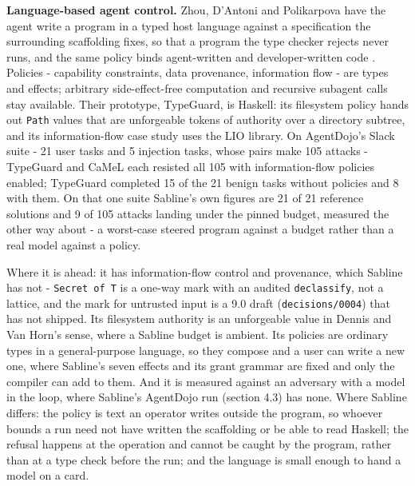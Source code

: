 \documentclass[
]{article}
\newcounter{none} %
\begin{document}
\textbf{Language-based agent control.} Zhou, D'Antoni and Polikarpova
have the agent write a program in a typed host language against a
specification the surrounding scaffolding fixes, so that a program the
type checker rejects never runs, and the same policy binds agent-written
and developer-written code \citep{zhou2026lbac}. Policies - capability
constraints, data provenance, information flow - are types and effects;
arbitrary side-effect-free computation and recursive subagent calls stay
available. Their prototype, TypeGuard, is Haskell: its filesystem policy
hands out \texttt{Path} values that are unforgeable tokens of authority
over a directory subtree, and its information-flow case study uses the
LIO library. On AgentDojo's Slack suite - 21 user tasks and 5 injection
tasks, whose pairs make 105 attacks - TypeGuard and CaMeL each resisted
all 105 with information-flow policies enabled; TypeGuard completed 15
of the 21 benign tasks without policies and 8 with them. On that one
suite Sabline's own figures are 21 of 21 reference solutions and 9 of
105 attacks landing under the pinned budget, measured the other way
about - a worst-case steered program against a budget rather than a real
model against a policy.

Where it is ahead: it has information-flow control and provenance, which
Sabline has not - \texttt{Secret\ of\ T} is a one-way mark with an
audited \texttt{declassify}, not a lattice, and the mark for untrusted
input is a 9.0 draft (\texttt{decisions/0004}) that has not shipped. Its
filesystem authority is an unforgeable value in Dennis and Van Horn's
sense, where a Sabline budget is ambient. Its policies are ordinary
types in a general-purpose language, so they compose and a user can
write a new one, where Sabline's seven effects and its grant grammar are
fixed and only the compiler can add to them. And it is measured against
an adversary with a model in the loop, where Sabline's AgentDojo run
(section 4.3) has none. Where Sabline differs: the policy is text an
operator writes outside the program, so whoever bounds a run need not
have written the scaffolding or be able to read Haskell; the refusal
happens at the operation and cannot be caught by the program, rather
than at a type check before the run; and the language is small enough to
hand a model on a card.
\end{document}
